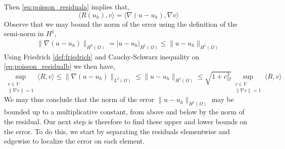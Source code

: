 Then \eqref{eq:poisson_residuala} implies that, 
\begin{equation} \label{eq:poisson_residualb}
\langle R(u_h), v \rangle =  \langle \nabla (u-u_h), \nabla v \rangle
\end{equation}
Observe that we may bound the norm of the error using the definition of the semi-norm in $H^1$,
\begin{align}
\|\nabla(u-u_h) \|_{H^0(\Omega)} = |u-u_h|_{H^1(\Omega)} \leq \|u-u_h\|_{H^1(\Omega)}
\end{align}
Using Friedrich \eqref{def:friedrich} and Cauchy-Schwarz inequality on \eqref{eq:poisson_residualb} we then have,
\begin{equation} \label{eq:poisson_sup}
\sup_{\substack{v\in V \\ \| \nabla v\|=1}} \langle R, v \rangle \leq \| \nabla (u-u_h) \|_{L^2(\Omega)}  \leq \| u-u_h \|_{H^1(\Omega)} \leq \sqrt{1+c^2_\Omega} \sup_{\substack{v\in V \\ \| \nabla v\|=1}}\langle R, v \rangle
\end{equation}
We may thus conclude that the norm of the error $\| u-u_h \|_{H^1(\Omega)}$ may be bounded up to a multiplicative constant, from above and below by the norm of the residual. Our next step is therefore to find these upper and lower bounds on the error. To do this, we start by separating the residuals elementwise and edgewise to localize the error on each element.

